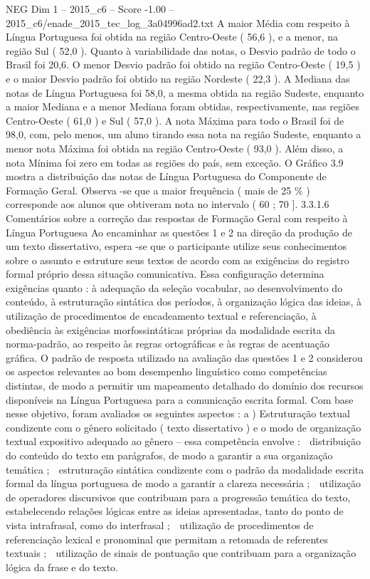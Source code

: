 \begin{textsample}{NEG Dim 1 – 2015\_c6 – Score -1.00 – 2015\_c6/enade\_2015\_tec\_log\_3a04996ad2.txt}
A maior Média com respeito à Língua Portuguesa foi obtida na região Centro-Oeste ( 56,6 ), e a menor, na região Sul ( 52,0 ).
Quanto à variabilidade das notas, o Desvio padrão de todo o Brasil foi 20,6.
O menor Desvio padrão foi obtido na região Centro-Oeste ( 19,5 ) e o maior Desvio padrão foi obtido na região Nordeste ( 22,3 ).
A Mediana das notas de Língua Portuguesa foi 58,0, a mesma obtida na região Sudeste, enquanto a maior Mediana e a menor Mediana foram obtidas, respectivamente, nas regiões Centro-Oeste ( 61,0 ) e Sul ( 57,0 ).
A nota Máxima para todo o Brasil foi de 98,0, com, pelo menos, um aluno tirando essa nota na região Sudeste, enquanto a menor nota Máxima foi obtida na região Centro-Oeste ( 93,0 ).
Além disso, a nota Mínima foi zero em todas as regiões do país, sem exceção.
O Gráfico 3.9 mostra a distribuição das notas de Língua Portuguesa do Componente de Formação Geral.
Observa -se que a maior frequência ( mais de 25 \% ) corresponde aos alunos que obtiveram nota no intervalo ( 60 ; 70 ]. 3.3.1.6 Comentários sobre a correção das respostas de Formação Geral com respeito à Língua Portuguesa Ao encaminhar as questões 1 e 2 na direção da produção de um texto dissertativo, espera -se que o participante utilize seus conhecimentos sobre o assunto e estruture seus textos de acordo com as exigências do registro formal próprio dessa situação comunicativa.
Essa configuração determina exigências quanto : à adequação da seleção vocabular, ao desenvolvimento do conteúdo, à estruturação sintática dos períodos, à organização lógica das ideias, à utilização de procedimentos de encadeamento textual e referenciação, à obediência às exigências morfossintáticas próprias da modalidade escrita da norma-padrão, ao respeito às regras ortográficas e às regras de acentuação gráfica.
O padrão de resposta utilizado na avaliação das questões 1 e 2 considerou os aspectos relevantes ao bom desempenho linguístico como competências distintas, de modo a permitir um mapeamento detalhado do domínio dos recursos disponíveis na Língua Portuguesa para a comunicação escrita formal.
Com base nesse objetivo, foram avaliados os seguintes aspectos : a ) Estruturação textual condizente com o gênero solicitado ( texto dissertativo ) e o modo de organização textual expositivo adequado ao gênero – essa competência envolve :  distribuição do conteúdo do texto em parágrafos, de modo a garantir a sua organização temática ;  estruturação sintática condizente com o padrão da modalidade escrita formal da língua portuguesa de modo a garantir a clareza necessária ;  utilização de operadores discursivos que contribuam para a progressão temática do texto, estabelecendo relações lógicas entre as ideias apresentadas, tanto do ponto de vista intrafrasal, como do interfrasal ;  utilização de procedimentos de referenciação lexical e pronominal que permitam a retomada de referentes textuais ;  utilização de sinais de pontuação que contribuam para a organização lógica da frase e do texto.

\end{textsample}
